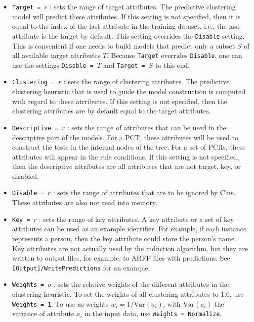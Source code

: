 \documentclass[a4paper]{report}
\begin{document}
\begin{itemize}
\item {\tt Target = $r$} : sets the range of target attributes. The predictive clustering model will predict these attributes. If this setting is not specified, then it is equal to the index of the last attribute in the training dataset, i.e., the last attribute is the target by default. This setting overrides the \texttt{Disable} setting. This is convenient if one needs to build models that predict only a subset $S$ of all available target attributes $T$. Because {\tt Target} overrides {\tt Disable}, one can use the settings {\tt Disable = $T$} and {\tt Target = $S$} to this end. 

\item {\tt Clustering = $r$} : sets the range of clustering attributes. The predictive clustering heuristic that is used to guide the model construction is computed with regard to these atrributes. If this setting is not specified, then the clustering attributes are by default equal to the target attributes.

\item {\tt Descriptive = $r$} : sets the range of attributes that can be used in the descriptive part of the models. For a PCT, these attributes will be used to construct the tests in the internal nodes of the tree. For a set of PCRs, these attributes will appear in the rule conditions. If this setting is not specified, then the descriptive attributes are all attributes that are not target, key, or disabled.

\item {\tt Disable = $r$} : sets the range of attributes that are to be ignored by Clus. These attributes are also not read into memory.

\item {\tt Key = $r$} : sets the range of key attributes. A key attribute or a set of key attributes can be used as an example identifier. For example, if each instance represents a person, then the key attribute could store the person's name. Key attributes are not actually used by the induction algorithm, but they are written to output files, for example, to ARFF files with predictions. See \texttt{[Output]/WritePredictions} for an example.

\item {\tt Weights = $o$} : sets the relative weights of the different attributes in the clustering heuristic. To set the weights of all clustering attributes to 1.0, use {\tt Weights = 1}. To use as  weights $w_i = 1/\mathrm{Var}(a_i)$, with $\mathrm{Var}(a_i)$ the variance of attribute $a_i$ in the input data, use {\tt Weights = Normalize}.
\end{itemize}
\end{document}
